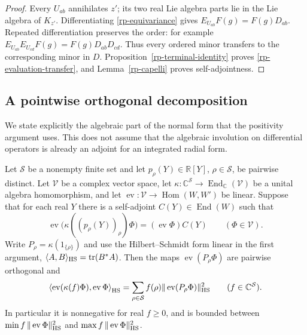 \begin{proof}
Every $U_{ab}$ annihilates $z'$; its two real Lie algebra
parts lie in the Lie algebra of $K_{z'}$.
Differentiating \eqref{rp-equivariance} gives
$E_{U_{ab}}F(g)=F(g)D_{ab}$.  Repeated differentiation
preserves the order: for example
$E_{U_{ab}}E_{U_{cd}}F(g)=F(g)D_{ab}D_{cd}$.
Thus every ordered minor transfers to the corresponding
minor in $D$.  Proposition~\ref{rp-terminal-identity}
proves \eqref{rp-evaluation-transfer}, and
Lemma~\ref{rp-capelli} proves self-adjointness.
\end{proof}

\subsection{A pointwise orthogonal decomposition}

We state explicitly the algebraic part of the normal
form that the positivity argument uses.  This does not
assume that the algebraic involution on differential
operators is already an adjoint for an integrated
radial form.

\begin{proposition}\label{rp-idempotent-positive}
Let $\mathcal S$ be a nonempty finite set and let
$p_\rho(Y)\in\mathbb R[Y]$, $\rho\in\mathcal S$, be
pairwise distinct.  Let $\mathcal V$ be a complex vector
space, let
$\kappa:\mathbb C^{\mathcal S}\to
\operatorname{End}_{\mathbb C}(\mathcal V)$ be a unital
algebra homomorphism, and let
$\operatorname{ev}:\mathcal V\to\operatorname{Hom}(W,W')$
be linear.  Suppose that for each real $Y$ there is a
self-adjoint $C(Y)\in\operatorname{End}(W)$ such that
\begin{equation}\label{rp-normal-evaluation}
 \operatorname{ev}\bigl(\kappa((p_\rho(Y))_\rho)\Phi\bigr)
                         =(\operatorname{ev}\Phi)C(Y)
                  \qquad(\Phi\in\mathcal V).
\end{equation}
Write $P_\rho=\kappa(1_{\{\rho\}})$ and use the
Hilbert--Schmidt form linear in the first argument,
$\langle A,B\rangle_{\rm HS}=\operatorname{tr}(B^*A)$.
Then the maps $\operatorname{ev}(P_\rho\Phi)$ are
pairwise orthogonal and
\begin{equation}\label{rp-positive-decomposition}
 \left\langle\operatorname{ev}(\kappa(f)\Phi),
                    \operatorname{ev}\Phi\right\rangle_{\rm HS}
       =\sum_{\rho\in\mathcal S}
              f(\rho)\|\operatorname{ev}(P_\rho\Phi)\|_{\rm HS}^2
                  \qquad(f\in\mathbb C^{\mathcal S}).
\end{equation}
In particular it is nonnegative for real $f\geq0$,
and is bounded between
$\min f\,\|\operatorname{ev}\Phi\|_{\rm HS}^2$ and
$\max f\,\|\operatorname{ev}\Phi\|_{\rm HS}^2$.
\end{proposition}

